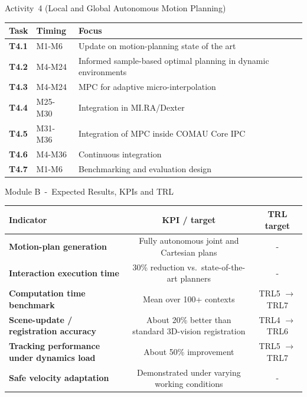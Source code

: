\documentclass[aspectratio=169,10pt]{beamer}
\begin{document}
\begin{frame}{Activity~4 (Local and Global Autonomous Motion Planning)}

\small
\begin{tabularx}{\textwidth}{>{\bfseries}p{} p{} X}
\toprule
Task & Timing & Focus \\
\midrule
T4.1 & M1-M6 & Update on motion-planning state of the art \\
T4.2 & M4-M24 & Informed sample-based optimal planning in dynamic environments \\
T4.3 & M4-M24 & MPC for adaptive micro-interpolation \\
T4.4 & M25-M30 & Integration in MI.RA/Dexter \\
T4.5 & M31-M36 & Integration of MPC inside COMAU Core IPC \\
T4.6 & M4-M36 & Continuous integration \\
T4.7 & M1-M6 & Benchmarking and evaluation design \\
\bottomrule
\end{tabularx}

\end{frame}


\begin{frame}{Module B~-~Expected Results, KPIs and TRL}

\small
\begin{tabularx}{\textwidth}{>{\bfseries}X c c}
\toprule
Indicator & KPI / target & TRL target \\
\midrule
Motion-plan generation & Fully autonomous joint and Cartesian plans &~-~\\
Interaction execution time & 30\% reduction vs.\ state-of-the-art planners &~-~\\
Computation time benchmark & Mean over 100+ contexts & TRL5 $\rightarrow$ TRL7 \\
Scene-update / registration accuracy & About 20\% better than standard 3D-vision registration & TRL4 $\rightarrow$ TRL6 \\
Tracking performance under dynamics load & About 50\% improvement & TRL5 $\rightarrow$ TRL7 \\
Safe velocity adaptation & Demonstrated under varying working conditions &~-~\\
\bottomrule
\end{tabularx}

\end{frame}
\end{document}
